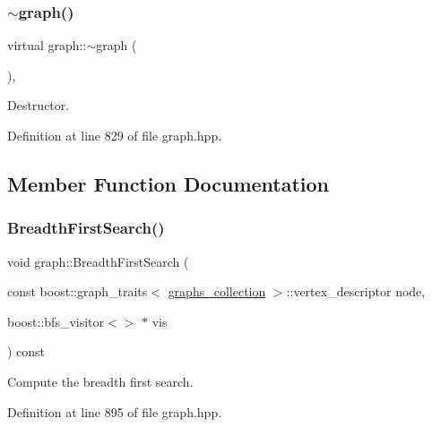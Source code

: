 \subsubsection{\texorpdfstring{$\sim$graph()}{~graph()}}
{\footnotesize\ttfamily virtual graph\+::$\sim$graph (\begin{DoxyParamCaption}{ }\end{DoxyParamCaption})\hspace{0.3cm}{\ttfamily [inline]}, {\ttfamily [virtual]}}



Destructor. 



Definition at line 829 of file graph.\+hpp.



\subsection{Member Function Documentation}
\mbox{\label{structgraph_a66dd5720c5d46cfd94257d98ef05e562}} 
\subsubsection{\texorpdfstring{Breadth\+First\+Search()}{BreadthFirstSearch()}}
{\footnotesize\ttfamily void graph\+::\+Breadth\+First\+Search (\begin{DoxyParamCaption}\item[{const boost\+::graph\+\_\+traits$<$ \hyperlink{structgraphs__collection}{graphs\+\_\+collection} $>$\+::vertex\+\_\+descriptor}]{node,  }\item[{boost\+::bfs\+\_\+visitor$<$$>$ $\ast$}]{vis }\end{DoxyParamCaption}) const\hspace{0.3cm}{\ttfamily [inline]}}



Compute the breadth first search. 



Definition at line 895 of file graph.\+hpp.

\mbox{\label{structgraph_afd6fd622c1f31f8b21da7b46bc1d5dba}} 
